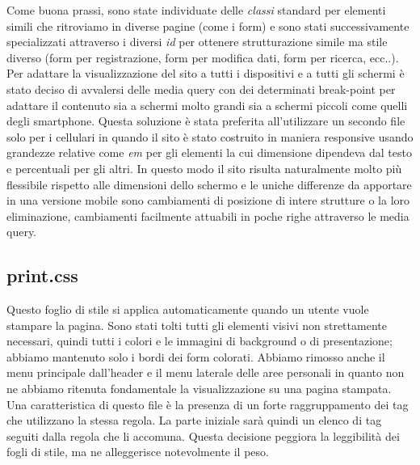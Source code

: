 	Come buona prassi, sono state individuate delle \emph{classi} standard per elementi simili che ritroviamo in diverse pagine (come i form) e sono stati successivamente specializzati attraverso i diversi \emph{id} per ottenere strutturazione simile ma stile diverso (form per registrazione, form per modifica dati, form per ricerca, ecc..).\\
	Per adattare la visualizzazione del sito a tutti i dispositivi e a tutti gli schermi è stato deciso di avvalersi delle media query con dei determinati break-point per adattare il contenuto sia a schermi molto grandi sia a schermi piccoli come quelli degli smartphone. Questa soluzione è stata preferita all'utilizzare un secondo file solo per i cellulari in quando il sito è stato costruito in maniera responsive usando grandezze relative come \emph{em} per gli elementi la cui dimensione dipendeva dal testo e percentuali per gli altri. In questo modo il sito risulta naturalmente molto più flessibile rispetto alle dimensioni dello schermo e le uniche differenze da apportare in una versione mobile sono cambiamenti di posizione di intere strutture o la loro eliminazione, cambiamenti facilmente attuabili in poche righe attraverso le media query.

	
	\subsection{print.css}
	Questo foglio di stile si applica automaticamente quando un utente vuole
stampare la pagina. Sono stati tolti tutti gli elementi visivi non strettamente necessari, quindi tutti i colori e le immagini di background o di presentazione; abbiamo mantenuto solo i bordi dei form colorati. Abbiamo rimosso anche il menu principale dall'header e il menu laterale delle aree personali in quanto non ne abbiamo ritenuta fondamentale la visualizzazione su una pagina stampata. Una caratteristica di questo file è la presenza di un forte raggruppamento dei tag che utilizzano la stessa regola. La parte iniziale sarà quindi un elenco di tag seguiti dalla regola che li accomuna. Questa decisione peggiora la leggibilità dei fogli di stile, ma ne alleggerisce notevolmente il peso.




